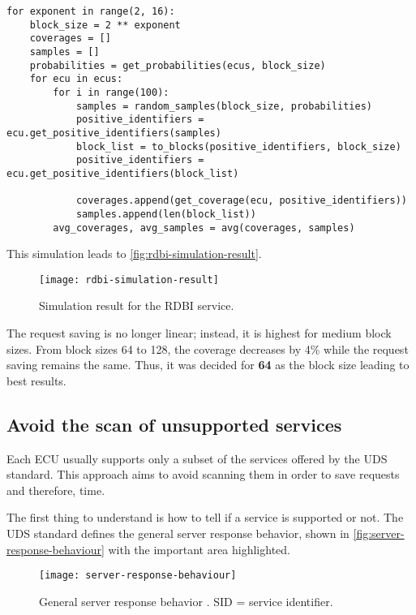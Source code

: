 \begin{samepage}
\begin{verbatim}
for exponent in range(2, 16):
    block_size = 2 ** exponent
    coverages = []
    samples = []
    probabilities = get_probabilities(ecus, block_size)
    for ecu in ecus:
        for i in range(100):
            samples = random_samples(block_size, probabilities)
            positive_identifiers = ecu.get_positive_identifiers(samples)
            block_list = to_blocks(positive_identifiers, block_size)
            positive_identifiers = ecu.get_positive_identifiers(block_list)

            coverages.append(get_coverage(ecu, positive_identifiers))
            samples.append(len(block_list))
        avg_coverages, avg_samples = avg(coverages, samples)
\end{verbatim}
\end{samepage}

This simulation leads to \autoref{fig:rdbi-simulation-result}.

\begin{figure}[h]
    \centering
    \texttt{[image: rdbi-simulation-result]}
    \caption{Simulation result for the RDBI service.}
    \label{fig:rdbi-simulation-result}
\end{figure}

The request saving is no longer linear; instead, it is highest for medium block sizes. From block sizes 64 to 128, the coverage decreases by 4\% while the request saving remains the same. Thus, it was decided for \textbf{64} as the block size leading to best results.


\subsection{Avoid the scan of unsupported services}

Each ECU usually supports only a subset of the services offered  by the UDS standard. This approach aims to avoid scanning them in order to save requests and therefore, time.

The first thing to understand is how to tell if a service is supported or not. The UDS standard defines the general server response behavior, shown in \autoref{fig:server-response-behaviour} with the important area highlighted.

\begin{figure}[h]
    \centering
    \texttt{[image: server-response-behaviour]}
    \caption{General server response behavior \cite{iso14229}. SID = service identifier.}
    \label{fig:server-response-behaviour}
\end{figure}

